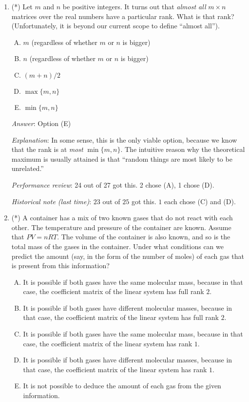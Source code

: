 \documentclass[10pt]{amsart}
\begin{document}
\begin{enumerate}
\item (*) Let $m$ and $n$ be positive integers. It turns out that {\em
  almost all} $m \times n$ matrices over the real numbers have a
  particular rank. What is that rank? (Unfortunately, it is beyond our
  current scope to define ``almost all'').

  \begin{enumerate}[(A)]
  \item $m$ (regardless of whether $m$ or $n$ is bigger)
  \item $n$ (regardless of whether $m$ or $n$ is bigger)
  \item $(m + n)/2$
  \item $\max \{ m,n \}$
  \item $\min \{ m,n \}$
  \end{enumerate}

  {\em Answer}: Option (E)

  {\em Explanation}: In some sense, this is the only viable option,
  because we know that the rank is at {\em most} $\min \{ m,n \}$. The
  intuitive reason why the theoretical maximum is usually attained is
  that ``random things are most likely to be unrelated.'' 

  {\em Performance review}: 24 out of 27 got this. 2 chose (A), 1
  chose (D).

  {\em Historical note (last time)}: $23$ out of $25$ got this. $1$ each chose
  (C) and (D).

\item (*) A container has a mix of two known gases that do not react
  with each other. The temperature and pressure of the container are
  known. Assume that $PV = nRT$. The volume of the container is also
  known, and so is the total mass of the gases in the container. Under
  what conditions can we predict the amount (say, in the form of the
  number of moles) of each gas that is present from this information?

  \begin{enumerate}[(A)]
  \item It is possible if both gases have the same molecular mass,
    because in that case, the coefficient matrix of the linear system
    has full rank $2$.
  \item It is possible if both gases have different molecular
    masses, because in that case, the coefficient matrix of the linear
    system has full rank $2$.
  \item It is possible if both gases have the same molecular mass,
    because in that case, the coefficient matrix of the linear system
    has rank $1$.
  \item It is possible if both gases have different molecular
    masses, because in that case, the coefficient matrix of the linear
    system has rank $1$.
  \item It is not possible to deduce the amount of each gas from the
    given information.
  \end{enumerate}


\end{enumerate}
\end{document}
